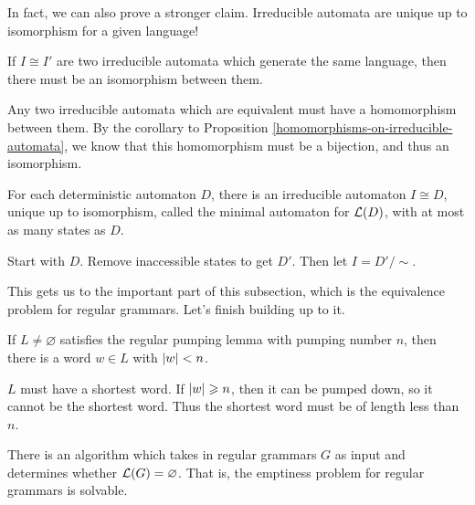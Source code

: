 \documentclass{article}
\begin{document}
In fact, we can also prove a stronger claim. Irreducible automata are unique up to isomorphism for a given language!

\begin{theorem}
	\label{irreducible-automata-unique}
	If $I \cong I'$ are two irreducible automata which generate the same language, then there must be an isomorphism between them.
\end{theorem}

\begin{prf}
	Any two irreducible automata which are equivalent must have a homomorphism between them. By the corollary to Proposition \ref{homomorphisms-on-irreducible-automata}, we know that this homomorphism must be a bijection, and thus an isomorphism.
\end{prf}

\begin{proposition}
	\label{minimal-automaton}
	For each deterministic automaton $D$, there is an irreducible automaton $I \cong D$, unique up to isomorphism, called the minimal automaton for $\mathcal{L}(D)$, with at most as many states as $D$.
\end{proposition}

\begin{prf}
	Start with $D$. Remove inaccessible states to get $D'$. Then let $I = D' / \sim$.
\end{prf}

This gets us to the important part of this subsection, which is the equivalence problem for regular grammars. Let's finish building up to it.

\begin{proposition}
	If $L \neq \varnothing$ satisfies the regular pumping lemma with pumping number $n$, then there is a word $w \in L$ with $\left\lvert w \right\rvert < n$.
\end{proposition}

\begin{prf}
	$L$ must have a shortest word. If $\left\lvert w \right\rvert \geqslant n$, then it can be pumped down, so it cannot be the shortest word. Thus the shortest word must be of length less than $n$.
\end{prf}

\begin{proposition}
	\label{reg-emptiness-solvable}
	There is an algorithm which takes in regular grammars $G$ as input and determines whether $\mathcal{L}(G) = \varnothing$. That is, the emptiness problem for regular grammars is solvable.
\end{proposition}
\end{document}
